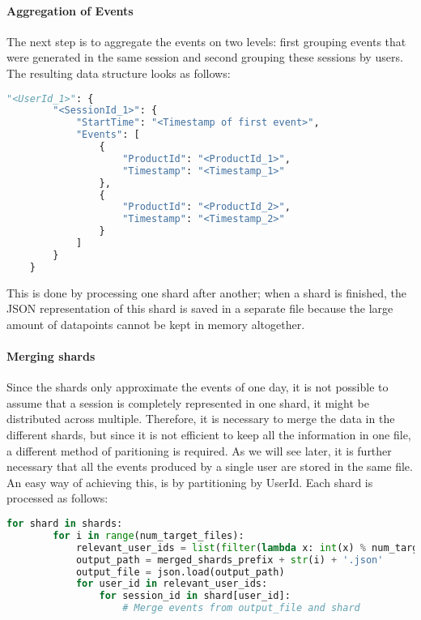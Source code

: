 \paragraph{Aggregation of Events}
The next step is to aggregate the events on two levels: first grouping events that were generated in the same session and second grouping these sessions by users.
The resulting data structure looks as follows:
\begin{minipage}{\linewidth}
    \begin{lstlisting}[language=Python,frame=single,caption=Data Structure for user-events,label=code:user-events]
    "<UserId_1>": {
        "<SessionId_1>": {
            "StartTime": "<Timestamp of first event>",
            "Events": [
                {
                    "ProductId": "<ProductId_1>",
                    "Timestamp": "<Timestamp_1>"
                },
                {
                    "ProductId": "<ProductId_2>",
                    "Timestamp": "<Timestamp_2>"
                }
            ]
        }
    }
    \end{lstlisting}
\end{minipage}
This is done by processing one shard after another; when a shard is finished, the JSON representation of this shard is saved in a separate file because the large amount of datapoints cannot be kept in memory altogether.
\paragraph{Merging shards}
Since the shards only approximate the events of one day, it is not possible to assume that a session is completely represented in one shard, it might be distributed across multiple.
Therefore, it is necessary to merge the data in the different shards, but since it is not efficient to keep all the information in one file, a different method of paritioning is required.
As we will see later, it is further necessary that all the events produced by a single user are stored in the same file.
An easy way of achieving this, is by partitioning by UserId.
Each shard is processed as follows:
\begin{minipage}{\linewidth}
    \begin{lstlisting}[language=Python,frame=single,caption=Merging shards,label=code:merging-shards]
    for shard in shards:
        for i in range(num_target_files):
            relevant_user_ids = list(filter(lambda x: int(x) % num_target_files == i, shard.keys()))
            output_path = merged_shards_prefix + str(i) + '.json'
            output_file = json.load(output_path)
            for user_id in relevant_user_ids:
                for session_id in shard[user_id]:
                    # Merge events from output_file and shard
    \end{lstlisting}
\end{minipage}
